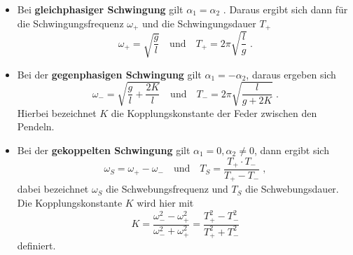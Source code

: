 \begin{itemize}
  \item Bei \textbf{gleichphasiger Schwingung} gilt $\alpha_1 = \alpha_2$ .
  Daraus ergibt sich dann für die Schwingungsfrequenz $\omega_+$
  und die Schwingungsdauer $T_+$
  \begin{equation}
  \omega_+ = \sqrt{\frac{g}{l}} \quad \text{und} \quad
  T_+ = 2\pi \sqrt{\frac{l}{g}}\;.
  \label{eqn:gls}
\end{equation}
\item Bei der \textbf{gegenphasigen Schwingung} gilt $\alpha_1 = - \alpha_2$,
daraus ergeben sich
\begin{equation}
   \omega_- = \sqrt{\frac{g}{l} + \frac{2K}{l}} \quad \text{und} \quad
   T_- = 2\pi \sqrt{\frac{l}{g+2K}}\;.
   \label{eqn:ggs}
 \end{equation}
 Hierbei bezeichnet $K$ die Kopplungskonstante der Feder zwischen den Pendeln.
 \item Bei der \textbf{gekoppelten Schwingung} gilt $\alpha_1 = 0, \alpha_2 \neq 0$,
 dann ergibt sich
 \begin{equation}
   \omega_S = \omega_+ - \omega_- \quad \text{und} \quad
   T_S = \frac{T_+\cdot T_-}{T_+ - T_-}\;,
   \label{eqn:gks}
 \end{equation}
 dabei bezeichnet $\omega_S$ die Schwebungsfrequenz und $T_S$ die Schwebungsdauer.
 Die Kopplungskonstante $K$ wird hier mit
 \begin{equation}
   K = \frac{\omega_- ^2 - \omega_+ ^2}{\omega_- ^2 + \omega_+ ^2}
   = \frac{T_+ ^2 - T_- ^2}{T_+ ^2 + T_- ^2}
   \label{eqn:K}
 \end{equation}
 definiert.

 \end{itemize}
